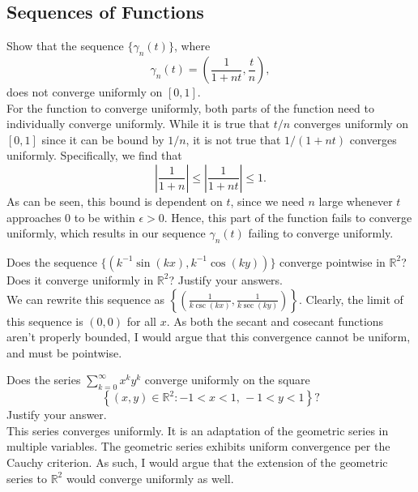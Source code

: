 \documentclass[12pt]{book}
\newcommand{\R}{\mathbb{R}}
\newenvironment{exercise}[2][Exercise]{\begin{trivlist}
\item[\hskip \labelsep {\bfseries #1}\hskip \labelsep {\bfseries #2.}]}{\end{trivlist}}
\begin{document}
\begin{exercise}{7.2.7}
\section{Sequences of Functions}


\begin{exercise}{8.3.1}
Show that the sequence $\{\gamma_n(t)\}$, where
    \[ \gamma_n(t) = \left( \frac{1}{1+n t}, \frac{t}{n} \right), \]
does not converge uniformly on $[0,1]$. \\

For the function to converge uniformly, both parts of the function need to individually converge uniformly. While it is true that $t/n$ converges uniformly on $[0,1]$ since it can be bound by $1/n$, it is not true that $1/(1+n t)$ converges uniformly. Specifically, we find that
    \[ \left| \frac{1}{1+n} \right| \leq \left| \frac{1}{1+ n t} \right| \leq 1. \]
As can be seen, this bound is dependent on $t$, since we need $n$ large whenever $t$ approaches 0 to be within $\epsilon>0$. Hence, this part of the function fails to converge uniformly, which results in our sequence $\gamma_n (t)$ failing to converge uniformly.
\end{exercise}



\begin{exercise}{8.3.3}
Does the sequence $\{ \left( k^{-1} \sin(kx), k^{-1} \cos(ky)  \right)\} $ converge pointwise in $\R^2$? Does it converge uniformly in $\R^2$? Justify your answers. \\

We can rewrite this sequence as $\left\{ \left( \frac{1}{k \csc(k x)}, \frac{1}{k \sec(k y)}  \right) \right\}$. Clearly, the limit of this sequence is $(0,0)$ for all $x$. As both the secant and cosecant functions aren't properly bounded, I would argue that this convergence cannot be uniform, and must be pointwise.
\end{exercise}




\begin{exercise}{8.3.8}
Does the series $\sum_{k=0}^\infty x^k y^k $ converge uniformly on the square
    \[ \left\{ (x,y) \in \R^2 : -1 < x <1,\,  -1 < y < 1   \right\}?\]
Justify your answer. \\

This series converges uniformly. It is an adaptation of the geometric series in multiple variables. The geometric series exhibits uniform convergence per the Cauchy criterion. As such, I would argue that the extension of the geometric series to $\R^2$ would converge uniformly as well.
\end{exercise}





\end{exercise}
\end{document}
